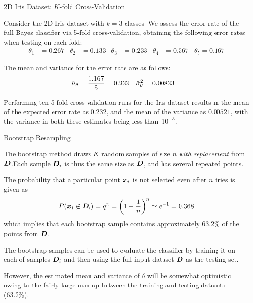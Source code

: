 \begin{frame}[fragile]{2D Iris Dataset: $K$-fold Cross-Validation}

Consider the 2D Iris dataset 
with $k=3$ classes. We assess
the error rate of the full Bayes classif\/{i}er via 5-fold
cross-validation, obtaining the following error rates when testing
on each fold:
\begin{align*}
  \theta_1 & = 0.267 & \theta_2 & = 0.133 &
  \theta_3 & = 0.233 & \theta_4 & = 0.367 & \theta_5 = 0.167
\end{align*}

The mean and variance for the error
rate are as follows:
\begin{align*}
  \hat{\mu}_\theta &= {1.167\over 5} = 0.233 & \hat{\sigma}^2_\theta & = 0.00833
\end{align*}

Performing ten
5-fold cross-validation runs for the Iris dataset results in the mean of the
expected error rate as $0.232$, and the mean of the variance as
$0.00521$, with the variance in both these estimates being
less than~$10^{-3}$.

\end{frame}



\begin{frame}{Bootstrap Resampling}

The bootstrap method draws $K$ random samples
of size $n$ {\em with replacement} from ${\boldsymbol D}$.Each sample ${\boldsymbol D}_i$
is thus the same size as ${\boldsymbol D}$, and has several repeated points.

\medskip
The probability that a particular point ${\boldsymbol x}_{j}$ is
not selected even after $n$ tries is given as
\begin{align*}
  P({\boldsymbol x}_{j} \not\in {\boldsymbol D}_i) = q^n  = \left( 1- {1\over n}\right)^n \simeq
  e^{-1} = 0.368
\end{align*}
which implies 
that each bootstrap sample contains approximately $63.2\%$ of the
points from ${\boldsymbol D}$.

\medskip
The bootstrap samples can be used to evaluate the classif\/{i}er by
training it on each of samples ${\boldsymbol D}_i$ and then using the full
input dataset ${\boldsymbol D}$ as the testing set.

\medskip
However, the estimated mean and variance of $\theta$ will be
somewhat optimistic owing to the fairly large overlap between the
training and testing datasets (63.2\%). 
\end{frame}




